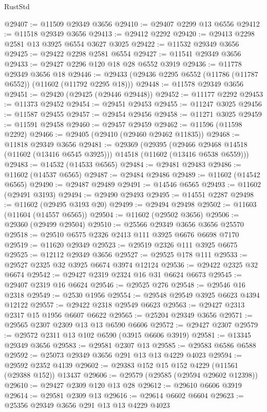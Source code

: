 \begin{lexlean}{RustStd}
\begin{coremodule}
@29407 := @11509 @29349 @3656
@29410 := @29407 @2299 @13 @6556
@29412 := @11518 @29349 @3656
@29413 := @29412 @2292
@29420 := @29413 @2298 @2581 @13 @3925 @6554 @3627 @3025
@29422 := @11532 @29349 @3656
@29425 := @29422 @2298 @2581 @6554
@29427 := @11541 @29349 @3656
@29433 := @29427 @2296 @120 @18 @28 @6552 @3919
@29436 := @11778 @29349 @3656 @18
@29446 := @29433 (@29436 @2295 @6552 (@11786 (@11787 @6552)) (@11602 (@11792 @2295 @18)))
@29448 := @11578 @29349 @3656
@29451 := @29420 (@29425 (@29446 @29448))
@29452 := @11177 @2292
@29453 := @11373 @29452
@29454 := @29451 @29453
@29455 := @11247 @3025
@29456 := @11587 @29455
@29457 := @29454 @29456
@29458 := @11271 @3025
@29459 := @11591 @29458
@29460 := @29457 @29459
@29462 := @11596 (@11598 @2292)
@29466 := @29405 (@29410 (@29460 @29462 @11835))
@29468 := @11818 @29349 @3656
@29481 := @29369
    (@29395
      (@29466 @29468 @14518 (@11602 (@13416 @6545 @3925)))
      @14518
      (@11602 (@13416 @6538 @6559)))
@29483 := @14532 (@14533 @6565)
@29484 := @29481 @29483
@29486 := @11602 (@14537 @6565)
@29487 := @29484 @29486
@29489 := @11602 (@14542 @6565)
@29490 := @29487 @29489
@29491 := @14546 @6565
@29493 := @11602 (@29491 @3193)
@29494 := @29490 @29493
@29495 := @14551 @2287
@29498 := @11602 (@29495 @3193 @20)
@29499 := @29494 @29498
@29502 := @11603 (@11604 (@14557 @6565))
@29504 := @11602 (@29502 @3656)
@29506 := @29360 (@29499 @29504)
@29510 := @25566 @29349 @3656 @3656 @25570
@29518 := @29510 @6575 @2326 @2413 @111 @3925 @6676 @6698 @7170
@29519 := @11620 @29349
@29523 := @29519 @2326 @111 @3925 @6675
@29525 := @12112 @29349 @3656
@29527 := @29525 @178 @111
@29533 := @29527 @2325 @32 @3925 @6674 @3974 @12124
@29536 := @29422 @2325 @32 @6674
@29542 := @29427 @2319 @2324 @16 @31 @6624 @6673
@29545 := @29407 @2319 @16 @6624
@29546 := @29525 @276
@29548 := @29546 @16 @2318
@29549 := @2530 @1956
@29554 := @29548 @29549 @3925 @6623 @4394 @12122
@29557 := @29422 @2318 @29549 @6623
@29563 := @29427 @2313 @2317 @15 @1956 @6607 @6622
@29565 := @25204 @29349 @3656
@29571 := @29565 @2307 @2309 @13 @13 @6590 @6606
@29572 := @29427 @2307
@29579 := @29572 @2311 @13 @102 @6590 (@3915 @6606 @3919)
@29581 := @13345 @29349 @3656
@29583 := @29581 @2307 @13
@29585 := @29583 @6586 @6588
@29592 := @25073 @29349 @3656 @291 @13 @13 @4229 @4023
@29594 := @29592 @2352 @4139
@29602 := @29383 @152 @15 @152 @4229 (@11561 (@29388 @152)) @13437
@29606 := @29579 (@29585 (@29594 @29602 @12398))
@29610 := @29427 @2309 @120 @13 @28
@29612 := @29610 @6606 @3919
@29614 := @29581 @2309 @13
@29616 := @29614 @6602 @6604
@29623 := @25356 @29349 @3656 @291 @13 @13 @4229 @4023

\end{coremodule}
\end{lexlean}
